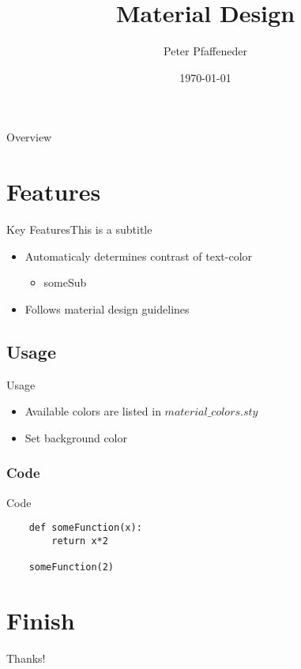 \documentclass{beamer}
\title{Material Design}
\date{\today}
\author{Peter Pfaffeneder}
\institute[Technische Mathematik]
\begin{document}

\begin{frame}
	\titlepage
\end{frame}

{
	\begin{frame}{Overview}
		\tableofcontents
	\end{frame}
}


\section{Features}
\begin{frame}{Key Features}{This is a subtitle}

	\begin{itemize}
		\item Automaticaly determines contrast of text-color
		\begin{itemize}
			\item someSub
		\end{itemize}
		\item Follows material design guidelines
	\end{itemize}
\end{frame}


\subsection{Usage}
\begin{frame}{Usage}
	\begin{itemize}
		\item Available colors are listed in $material\_colors.sty$
		\item Set background color
	\end{itemize}
\end{frame}

\subsubsection{Code}
\begin{frame}[fragile=singleslide]{Code}
	\begin{lstlisting}
	def someFunction(x):
		return x*2

	someFunction(2)
	\end{lstlisting}
\end{frame}

\section{Finish}
\begin{frame}{Thanks!}
\end{frame}
\end{document}

